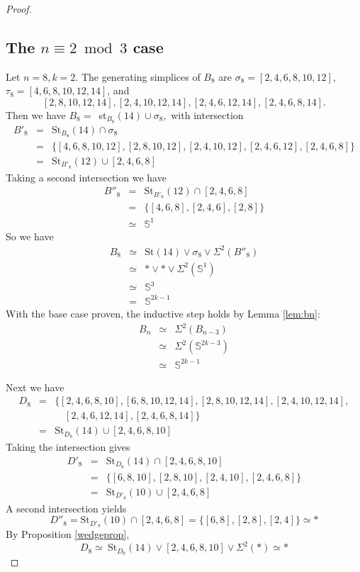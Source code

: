 \documentclass{amsart}
\theoremstyle{definition}
\newcommand{\zs}{{\mathbb S}}
\begin{document}
\begin{proof}
\subsection*{The $n\equiv 2\bmod 3$ case} Let $n=8,k=2$. The generating simplices of $B_8$ are $\sigma_8=[2,4,6,8,10,12]$, $\tau_8=[4,6,8,10,12,14]$, and $$[2,8,10,12,14],[2,4,10,12,14],[2,4,6,12,14], [2,4,6,8,14].$$ Then we have $B_8=$~st$_{B_8}(14)\cup\sigma_8,$  with intersection
    \begin{eqnarray*}
        B'_8 &= &\text{St}_{B_8}(14)\cap\sigma_8 \\
        & = &\{[4,6,8,10,12],[2,8,10,12],[2,4,10,12],[2,4,6,12],[2,4,6,8]\}\\
        &=  &\text{St}_{B'_8}(12)\cup[2,4,6,8]
    \end{eqnarray*}
Taking a second intersection we have 
\begin{eqnarray*}
    B''_8 &= &\text{St}_{B'_8}(12)\cap[2,4,6,8] \\
    & = &\{[4,6,8],[2,4,6],[2,8]\} \\
    & \simeq &\zs^{1}
\end{eqnarray*}
So we have
    \begin{eqnarray*}
    B_8 &\simeq &\text{St}(14)\vee\sigma_8\vee\Sigma^2(B''_8)\\
    & \simeq & \ast\vee\ast\vee\Sigma^2(\zs^1)\\
    & \simeq & \zs^3 \\
    &= &\zs^{2k-1}
    \end{eqnarray*}
With the base case proven, the inductive step holds by Lemma \ref{lem:bn}:
    \begin{eqnarray*}
        B_n &\simeq &\Sigma^2(B_{n-3})\\
        &\simeq &\Sigma^2(\zs^{2k-3})\\
        &\simeq & \zs^{2k-1}
    \end{eqnarray*}

Next we have
\begin{eqnarray*}
    D_8 & =&\{[2,4,6,8,10],[6,8,10,12,14],[2,8,10,12,14],[2,4,10,12,14],\\
    & & \quad [2,4,6,12,14],[2,4,6,8,14]\}\\
    &= &\text{St}_{D_8}(14)\cup[2,4,6,8,10]
\end{eqnarray*}
Taking the intersection gives
\begin{eqnarray*}
    D'_8 & = &\text{St}_{D_8}(14)\cap[2,4,6,8,10] \\
    &= &\{[6,8,10],[2,8,10],[2,4,10],[2,4,6,8]\}\\
    &= &\text{St}_{D'_8}(10)\cup[2,4,6,8]
\end{eqnarray*}
A second intersection yields $$D''_8=\text{St}_{D'_8}(10)\cap[2,4,6,8]=\{[6,8],[2,8],[2,4]\}\simeq *$$
By Proposition \ref{wedgeprop}, $$D_8\simeq~\text{St}_{D_8}(14)\vee[2,4,6,8,10]\vee\Sigma^2(*)\simeq *$$


\end{proof}
\end{document}
